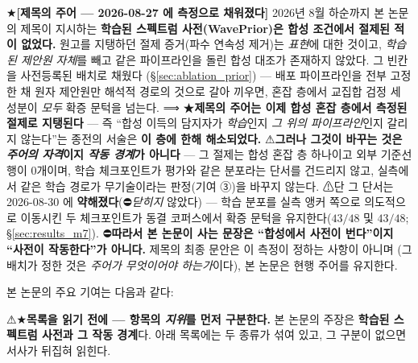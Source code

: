 \documentclass[11pt]{report}
\numberwithin{equation}{chapter}
\numberwithin{figure}{chapter}
\numberwithin{table}{chapter}
\begin{document}
★\textbf{[제목의 주어 --- 2026-08-27 에 측정으로 채워졌다]}
2026년 8월 하순까지 본 논문의 제목이 지시하는 \textbf{학습된 스펙트럼 사전(WavePrior)은
합성 조건에서 절제된 적이 없었다.} 원고를 지탱하던 절제 증거(파수 연속성 제거)는
\emph{표현}에 대한 것이고, \emph{학습된 제안원 자체}를 빼고 같은 파이프라인을 돌린 합성
대조가 존재하지 않았다. 그 빈칸을 사전등록된 배치로 채웠다
(\S\ref{sec:ablation_prior}) --- 배포 파이프라인을 전부 고정한 채 원자 제안원만 해석적
경로의 것으로 갈아 끼우면, 혼잡 층에서 교집합 검정 세 성분이 \emph{모두} 확증 문턱을
넘는다. ⟹ ★\textbf{제목의 주어는 이제 합성 혼잡 층에서 측정된 절제로 지탱된다}
--- 즉 ``합성 이득의 담지자가 \emph{학습}인지 \emph{그 위의 파이프라인}인지 갈리지
않는다''는 종전의 서술은 \textbf{이 층에 한해 해소되었다.}
⚠\textbf{그러나 그것이 바꾸는 것은 \emph{주어의 자격}이지 \emph{작동 경계}가 아니다}
--- 그 절제는 합성 혼잡 층 하나이고 외부 기준선 행이 $0$개이며, 학습 체크포인트가 평가와
같은 분포라는 단서를 건드리지 않고, 실측에서 같은 학습 경로가 무기술이라는 판정(기여 ③)을
바꾸지 않는다. ⚠단 그 단서는 2026-08-30 에 \textbf{약해졌다}(⛔\emph{닫히지} 않았다) --- 학습 분포를
실측 앵커 쪽으로 의도적으로 이동시킨 두 체크포인트가 동결 코퍼스에서 확증 문턱을
유지한다($43/48$ 및 $43/48$; \S\ref{sec:results_m7}). ⛔\textbf{따라서 본 논문이 사는 문장은 ``합성에서 사전이 번다''이지
``사전이 작동한다''가 아니다.} 제목의 최종 문안은 이 측정이 정하는 사항이 아니며
(그 배치가 정한 것은 \emph{주어가 무엇이어야 하는가}이다), 본 논문은 현행 주어를
유지한다.

본 논문의 주요 기여는 다음과 같다:

⚠★\textbf{목록을 읽기 전에 --- 항목의 \emph{지위}를 먼저 구분한다.}
본 논문의 주장은 \textbf{학습된 스펙트럼 사전과 그 작동 경계}다. 아래 목록에는 두 종류가
섞여 있고, 그 구분이 없으면 서사가 뒤집혀 읽힌다.
\end{document}
